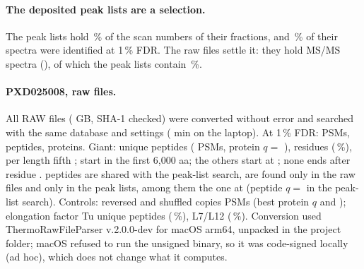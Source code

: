 \documentclass[11pt]{article}
\begin{document}
\paragraph{The deposited peak lists are a selection.} The peak lists hold \,\% of the scan numbers
of their fractions, and \,\% of their spectra were identified at 1\,\% FDR. The raw files settle it:
they hold  MS/MS spectra (), of which the peak lists contain \,\%.

\paragraph{PXD025008, raw files.} All  RAW files ( GB, SHA-1 checked) were converted
without error and searched with the same database and settings ( min on the laptop). At 1\,\% FDR:
 PSMs,  peptides,  proteins. Giant:  unique peptides
( PSMs, protein $q = $ ),  residues
(\,\%), per length fifth ;  start in the first 6,000 aa;
the others start at ; none ends after residue .  peptides are
shared with the peak-list search,  are found only in the raw files and  only in the peak
lists, among them the one at  (peptide $q = $  in the peak-list search).
Controls: reversed and shuffled copies  PSMs (best protein $q$  and );
elongation factor Tu  unique peptides (\,\%), L7/L12 
(\,\%). Conversion used ThermoRawFileParser v.2.0.0-dev for macOS arm64, unpacked in the project folder;
macOS refused to run the unsigned binary, so it was code-signed locally (ad hoc), which does not change what it computes.
\end{document}

